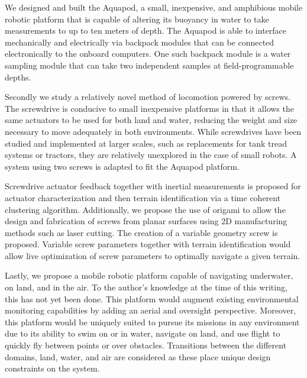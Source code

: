 We designed and built the Aquapod, a small, inexpensive, and amphibious mobile robotic platform that is capable of altering its buoyancy in water to take measurements to up to ten meters of depth. The Aquapod is able to interface mechanically and electrically via backpack modules that can be connected electronically to the onboard computers. One such backpack module is a water sampling module that can take two independent samples at field-programmable depths. 

Secondly we study a relatively novel method of locomotion powered by screws. The screwdrive is conducive to small inexpensive platforms in that it allows the same actuators to be used for both land and water, reducing the weight and size necessary to move adequately in both environments. While screwdrives have been studied and implemented at larger scales, such as replacements for tank tread systems or tractors, they are relatively unexplored in the case of small robots. A system using two screws is adapted to fit the Aquapod platform. 

Screwdrive actuator feedback together with inertial measurements is proposed for actuator characterization and then terrain identification via a time coherent clustering algorithm. Additionally, we propose the use of origami to allow the design and fabrication of screws from planar surfaces using 2D manufacturing methods such as laser cutting. The creation of a variable geometry screw is proposed. Variable screw parameters together with terrain identification would allow live optimization of screw parameters to optimally navigate a given terrain. 

Lastly, we propose a mobile robotic platform capable of navigating underwater, on land, and in the air. To the author's knowledge at the time of this writing, this has not yet been done. This platform would augment existing environmental monitoring capabilities by adding an aerial and oversight perspective. Moreover, this platform would be uniquely suited to pursue its missions in any environment due to its ability to swim on or in water, navigate on land, and use flight to quickly fly between points or over obstacles. Transitions between the different domains, land, water, and air are considered as these place unique design constraints on the system. 






